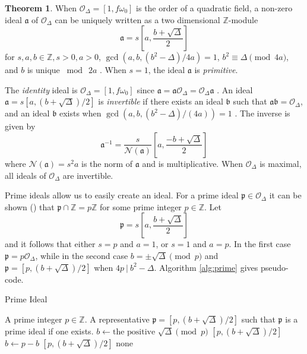 \documentclass{ucalgthes1}
\theoremstyle{definition}
\newtheorem{thm}{Theorem}[section]
\newcommand{\OO}{\mathcal{O}}
\newcommand{\ZZ}{\mathbb{Z}}
\begin{document}
\begin{thm}
\label{thm:idealZModule}
When $\OO_\Delta = [1, f\omega_0]$ is the order of a quadratic field, a non-zero ideal $\mathfrak a$ of $\OO_\Delta$ can be uniquely written as a two dimensional $\ZZ$-module 
\[
	\mathfrak a = s\left[a, \frac{b+\sqrt{\Delta}}{2} \right]
\]
for $s, a, b \in \ZZ, s > 0, a > 0$, $\gcd(a, b, (b^2-\Delta)/4a)=1$, $b^2 \equiv \Delta \pmod{4a}$, and $b$ is unique $\bmod ~2a$ \cite[p.13]{Jacobson1999}. When $s = 1$, the ideal $\mathfrak a$ is \emph{primitive}.
\end{thm}

The \emph{identity} ideal is $\OO_\Delta = [1, f\omega_0]$ since $\mathfrak a = \mathfrak a \OO_\Delta = \OO_\Delta \mathfrak a$ \cite{Cohn1980}. An ideal $\mathfrak a = s[a, (b+\sqrt{\Delta})/2]$ is \emph{invertible} if there exists an ideal $\mathfrak b$ such that $\mathfrak a \mathfrak b = \OO_\Delta$, and an ideal $\mathfrak b$ exists when $\gcd(a, b, (b^2-\Delta)/(4a)) = 1$ \cite[p.14]{Jacobson1999}. The inverse is given by \cite[pp.14,15]{Jacobson1999}
\[
	{\mathfrak a}^{-1} = \frac{s}{\mathcal N(\mathfrak a)} \left[a, \frac{-b+\sqrt{\Delta}}{2} \right]
\]
where $\mathcal N(\mathfrak a) = s^2a$ is the norm of $\mathfrak a$ and is multiplicative. When $\OO_\Delta$ is maximal, all ideals of $\OO_\Delta$ are invertible. 

Prime ideals allow us to easily create an ideal.  For a prime ideal $\mathfrak p \in \OO_\Delta$ it can be shown (\cite[p.19]{Jacobson1999}) that $\mathfrak p \cap \ZZ = p\ZZ$ for some prime integer $p \in \ZZ$. Let
\[
	\mathfrak p = s\left[a, \frac{b + \sqrt{\Delta}}{2}\right]
\]
and it follows that either $s=p$ and $a=1$, or $s=1$ and $a=p$.  In the first case $\mathfrak p = p\OO_\Delta$, while in the second case $b = \pm \sqrt{\Delta} \pmod p$ and $\mathfrak p = [p, (b + \sqrt{\Delta})/2]$ when $4p ~|~ b^2 - \Delta$.  Algorithm \ref{alg:prime} gives pseudo-code.

\begin{algorithm}[h]
\caption{Prime Ideal}
\label{alg:prime}
\begin{algorithmic}[1]
\REQUIRE A prime integer $p \in \ZZ$.
\ENSURE A representative $\mathfrak p = [p, (b+\sqrt\Delta)/2]$ such that $\mathfrak p$ is a prime ideal if one exists.
\STATE $b \gets \textrm{the positive } \sqrt\Delta \pmod p$
	\RETURN $[p, (b+\sqrt\Delta)/2]$
\ENDIF
\STATE $b \gets p-b$
	\RETURN $[p, (b+\sqrt\Delta)/2]$
\ENDIF
\RETURN none
\end{algorithmic}
\end{algorithm}
\end{document}
